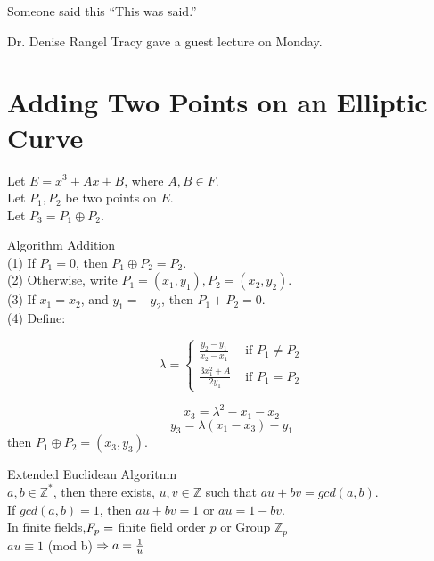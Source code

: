 \begin{chapquote}{Someone said this}
``This was said.''
\end{chapquote}

Dr. Denise Rangel Tracy gave a guest lecture on Monday.

\section{Adding Two Points on an Elliptic Curve}

Let $E=x^3+Ax+B$, where $A, B\in F$.
\\Let $P_{1}, P_{2}$ be two points on $E$. 
\\Let $P_{3}=P_{1} \oplus P_{2}$.

Algorithm Addition
\\(1) If $P_{1}=0$, then $P_{1} \oplus P_{2} = P_{2}$.
\\(2) Otherwise, write $P_{1}=(x_{1}, y_{1}), P_{2}=(x_{2}, y_{2})$.
\\(3) If $x_{1}=x_{2}$, and $y_{1}=-y_{2}$, then $P_{1}+P_{2}=0$.
\\(4) Define:

$$ \lambda =\begin{cases} \frac{y_{2}-y_{1}}{x_{2}-x_{1}} & \text{ if } P_{1}\neq P_{2} \\ \frac{3x_{1}^2+A}{2y_{1}} & \text{ if } P_{1}=P_{2} \end{cases}$$

$$x_{3} = \lambda ^2 - x_{1} - x_{2}$$
$$y_{3}=\lambda(x_{1}-x_{3})-y_{1}$$
then $P_{1} \oplus P_{2} = (x_{3},y_{3})$.

Extended Euclidean Algoritnm 
\\$a,b \in \mathbb{Z}^{*}$, then there exists, $u,v \in \mathbb{Z}$ such that $au+bv=gcd(a,b)$. \\If $gcd(a,b)=1$, then $au+bv=1$ or $au=1-bv$. 
\\In finite fields,$\\
F_p=$ finite field order $p$ or Group $\mathbb{Z}_p$
\\$au \equiv 1$ (mod b)$\\
\Rightarrow a= \frac{1}{u}$\\


